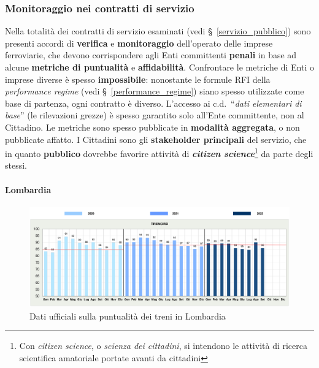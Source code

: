\documentclass[12pt,a4paper,italian]{report}
\begin{document}
\subsubsection{Monitoraggio nei contratti di servizio}

Nella totalità dei contratti di servizio esaminati (vedi
\S~\ref{servizio_pubblico}) sono presenti accordi di \textbf{verifica}
e \textbf{monitoraggio} dell'operato delle imprese ferroviarie, che
devono corrispondere agli Enti committenti \textbf{penali} in base ad
alcune \textbf{metriche di puntualità} e \textbf{affidabilità}.
Confrontare le metriche di Enti o imprese diverse è spesso
\textbf{impossibile}: nonostante le formule RFI della
\textit{performance regime} (vedi \S~\ref{performance_regime}) siano
spesso utilizzate come base di partenza, ogni contratto è diverso.
L'accesso ai c.d.\ ``\textit{dati elementari di base}'' (le
rilevazioni grezze) è spesso garantito solo all'Ente committente, non
al Cittadino.  Le metriche sono spesso pubblicate in \textbf{modalità
    aggregata}, o non pubblicate affatto.  I Cittadini sono gli
\textbf{stakeholder principali} del servizio, che in quanto
\textbf{pubblico} dovrebbe favorire attività di
\textbf{\textit{citizen science}}\footnote{Con \textit{citizen
        science}, o \textit{scienza dei cittadini}, si intendono le
    attività di ricerca scientifica amatoriale portate avanti da
    cittadini} da parte degli stessi.

\paragraph{Lombardia}

\begin{figure}[h] \centering
    \includegraphics[width=1\textwidth]{images/lombardia_puntualita.png}
	\caption{Dati ufficiali sulla puntualità dei treni in Lombardia
        \cite{LombardiaDati}}
    \label{lombardia_puntualita}
\end{figure}
\end{document}
